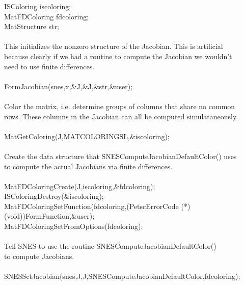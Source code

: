 \begin{tabbing}
   ISColoring    iscoloring;\\
   MatFDColoring fdcoloring;\\
   MatStructure  str;\\

   \trl{/*}\\
      This initializes the nonzero structure of the Jacobian. This is artificial\\
      because clearly if we had a routine to compute the Jacobian we wouldn't\\
      need to use finite differences.\\
   \trl{*/}\\
   FormJacobian(snes,x,\&J,\&J,\&str,\&user);\\

   \trl{/*}\\
       Color the matrix, i.e. determine groups of columns that share no common \\
      rows. These columns in the Jacobian can all be computed simulataneously.\\
   \trl{*/}\\
   MatGetColoring(J,MATCOLORINGSL,\&iscoloring);\\

   \trl{/*}\\
       Create the data structure that SNESComputeJacobianDefaultColor() uses\\
       to compute the actual Jacobians via finite differences.\\
   \trl{*/}\\
   MatFDColoringCreate(J,iscoloring,\&fdcoloring);\\
   ISColoringDestroy(\&iscoloring);\\
   MatFDColoringSetFunction(fdcoloring,(PetscErrorCode (*)(void))FormFunction,\&user);\\
   MatFDColoringSetFromOptions(fdcoloring);\\

   \trl{/*}\\
      Tell SNES to use the routine SNESComputeJacobianDefaultColor()\\
      to compute Jacobians.\\
   \trl{*/}\\
   SNESSetJacobian(snes,J,J,SNESComputeJacobianDefaultColor,fdcoloring);\\

\end{tabbing}

